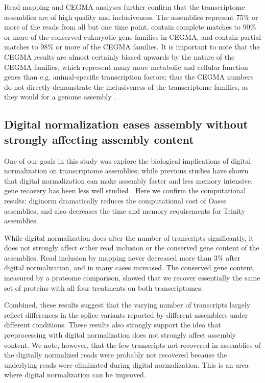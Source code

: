 \documentclass[fleqn,10pt]{wlpeerj}
\begin{document}
Read mapping and CEGMA analyses further confirm that the transcriptome assemblies are of high quality and inclusiveness.  The assemblies represent 75\% or more of the reads from all but one time point, contain complete matches to 90\% or more of the conserved eukaryotic gene families in CEGMA, and contain partial matches to 98\% or more of the CEGMA families.   It is important to note that the CEGMA results are almost certainly biased upwards by the nature of the CEGMA families, which represent many more metabolic and cellular function genes than e.g. animal-specific transcription factors; thus the CEGMA numbers do not directly demonstrate the inclusiveness of the transcriptome families, as they would for a genome assembly \citep{parra_cegma:_2007}.

\subsection{Digital normalization eases assembly without strongly affecting assembly content}

One of our goals in this study was explore the biological implications of digital normalization on transcriptome assemblies; while previous studies have shown that digital normalization can make assembly faster and less memory intensive, gene recovery has been less well studied \citep{haas_novo_2013, brown_reference-free_2012, pell_scaling_2012}.  Here we confirm the computational results: diginorm dramatically reduces the computational cost of Oases assemblies, and also decreases the time and memory requirements for Trinity assemblies.

While digital normalization does alter the number of transcripts significantly, it does not strongly affect either read inclusion or the conserved gene content of the assemblies. Read inclusion by mapping never decreased more than 3\% after digital normalization, and in many cases increased. The conserved gene content, measured by a proteome comparison, showed that we recover essentially the same set of proteins with all four treatments on both transcriptomes.  

Combined, these results suggest that the varying number of transcripts largely reflect differences in the splice variants reported by different assemblers under different conditions. These results also strongly support the idea that preprocessing with digital normalization does not strongly affect assembly content.  We note, however, that the few transcripts not recovered in assemblies of the digitally normalized reads were probably not recovered because the underlying reads were eliminated during digital normalization.  This is an area where digital normalization can be improved.
\end{document}
